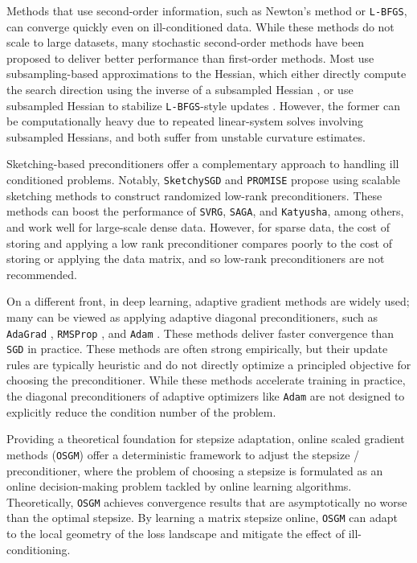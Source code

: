 \documentclass{article}
\theoremstyle{definition}
\newcommand{\os}{\texttt{OSGM}}
\newcommand{\svrg}{\texttt{SVRG}}
\newcommand{\saga}{\texttt{SAGA}}
\newcommand{\promise}{\texttt{PROMISE}}
\newcommand{\adam}{\texttt{Adam}}
\newcommand{\sgd}{\texttt{SGD}}
\begin{document}
Methods that use second-order information, such as Newton's method or \texttt{L-BFGS}, can converge quickly even on ill-conditioned data. 
While these methods do not scale to large datasets, 
many stochastic second-order methods have been proposed to deliver better performance than first-order methods. 
Most use subsampling-based approximations to the Hessian, 
which either directly compute the search direction using the inverse of a subsampled Hessian \cite{roosta2019sub, bollapragada2019exact, derezinski2022stochastic}, 
or use subsampled Hessian to stabilize \texttt{L-BFGS}-style updates \cite{byrd2016stochastic,moritz2016linearly, gower2016stochastic}.
However, the former can be computationally heavy due to repeated linear-system solves involving subsampled Hessians, and both suffer from unstable curvature estimates.

Sketching-based preconditioners offer a complementary approach to handling ill conditioned problems.
Notably, \texttt{SketchySGD} \cite{frangella2024sketchysgd} and {\promise} \cite{frangella2024promise} propose using scalable sketching methods to construct randomized low-rank preconditioners. 
These methods can boost the performance of {\svrg}, {\saga}, and \texttt{Katyusha}, among others, and work well for large-scale dense data.
However, for sparse data, the cost of storing and applying a low rank preconditioner compares poorly to the cost of storing or applying the data matrix, and so low-rank preconditioners are not recommended.

On a different front, in deep learning,
adaptive gradient methods are widely used; many can be viewed as applying adaptive diagonal preconditioners,
such as \texttt{AdaGrad} \cite{duchi2011adaptive}, \texttt{RMSProp} \cite{hinton2012neural}, and {\adam} \cite{kingma2014adam}.
These methods deliver faster convergence than {\sgd} in practice.
These methods are often strong empirically, but their update rules are typically heuristic and do not directly optimize a principled objective for choosing the preconditioner.
While these methods accelerate training in practice, the diagonal preconditioners of adaptive optimizers like {\adam} are not designed to explicitly reduce the condition number of the problem.

Providing a theoretical foundation for stepsize adaptation, online scaled gradient methods ({\os}) \cite{gao2025gradient,chu2025gradient} offer a deterministic framework to adjust the stepsize / preconditioner,
where the problem of choosing a stepsize is formulated as an online decision-making problem tackled by online learning algorithms.
Theoretically, {\os} achieves convergence results that are asymptotically no worse than the optimal stepsize.
By learning a matrix stepsize online, {\os} can adapt to the local geometry of the loss landscape and mitigate the effect of ill-conditioning.
\end{document}
